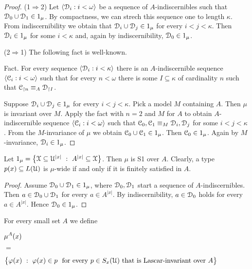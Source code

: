 \documentclass{amsproc}
\begin{document}
\begin{proof}
  (1$\Rightarrow$2)  Let $\langle\EuScript D_i:i<\omega\rangle$ be a sequence of $A$-indiscernibles such that $\EuScript D_0\cup\EuScript D_1\in1_\mu$.
  By compactness, we can strech this sequence one to length $\kappa$.
  From indiscernibility we obtain that $\EuScript D_i\cup\EuScript D_j\in1_\mu$ for every $i<j<\kappa$.
  Then $\EuScript D_i\in1_\mu$ for some $i<\kappa$ and, again by indiscernibility, $\EuScript D_0\in1_\mu$.

  (2$\Rightarrow$1)
  The following fact is well-known.
  
  Fact.
  For every sequence $\langle\EuScript D_i:i<\kappa\rangle$ there is an $A$-indiscernible sequence $\langle\EuScript C_i:i<\omega\rangle$ such that for every $n<\omega$ there is some $I\subseteq\kappa$ of cardinality $n$ such that $\EuScript C_{\restriction n}\equiv_A\EuScript D_{\restriction I}$.

  Suppose $\EuScript D_i\cup \EuScript D_j\in1_\mu$ for every $i<j<\kappa$.
  Pick a model $M$ containing $A$.
  Then $\mu$ is invariant over $M$.
  Apply the fact with $n=2$ and $M$ for $A$ to obtain $A$-indiscer\-nible sequence $\langle\EuScript C_i:i<\omega\rangle$ such that $\EuScript C_0,\EuScript C_1\equiv_M\EuScript D_i,\EuScript D_j$ for some $i<j<\kappa$.
  From the $M$-invariance of $\mu$ we obtain $\EuScript C_0\cup \EuScript C_1\in1_\mu$.
  Then $\EuScript C_0\in1_\mu$.
  Again by $M$-invariance, $\EuScript D_i\in1_\mu$.
\end{proof}

\begin{example}\label{ex_mu_fin_sat}
  Let $1_\mu=\big\{\EuScript X\subseteq\EuScript U^{|x|}\ :\ A^{|x|}\subseteq\EuScript X\big\}$.
  Then $\mu$ is S1 over $A$.
  Clearly, a type $p(x)\subseteq L(\EuScript U)$ is $\mu$-wide if and only if it is finitely satisfied in $A$.
\end{example}

\begin{proof} 
  Assume $\EuScript D_0\cup\EuScript D_1\in1_\mu$, where $\EuScript D_0,\EuScript D_1$ start a sequence of $A$-indiscernibles.
  Then $a\in\EuScript D_0\cup\EuScript D_1$ for every $a\in A^{|x|}$.
  By indiscernibility, $a\in\EuScript D_0$ holds for every $a\in A^{|x|}$.
  Hence $\EuScript D_0\in1_\mu$.
\end{proof}

For every small set $A$ we define

{\def\ceq#1#2#3{\parbox[t]{10ex}{$\displaystyle #1$}\parbox{6ex}{\hfil $#2$}{$\displaystyle #3$}}
\ceq{\hfill\mu^A(x)}{=}{\big\{\varphi(x)\ :\ \varphi(x)\in p\ {\rm\ for\ every\ }p\in S_x(\EuScript U)\ \textrm{that is Lascar-invariant over}\ A\big\}}}
\end{document}
